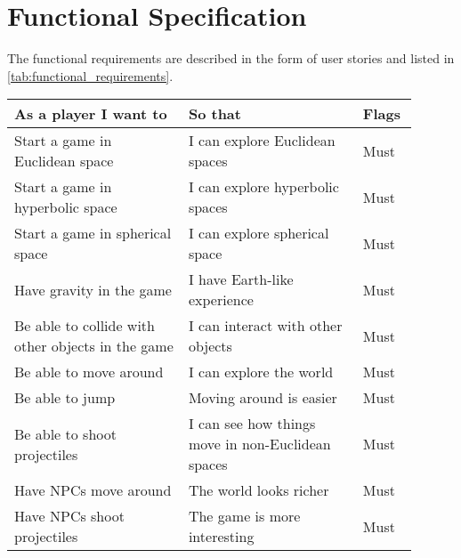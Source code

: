 \chapter{Functional Specification}\label{ch:functional_specification}
The functional requirements are described in the form of user stories and listed in \autoref{tab:functional_requirements}.

\begin{longtable}{|p{0.4\linewidth}|p{0.4\linewidth}|p{0.1\linewidth}|}
    \hline
    \textbf{As a player I want to}                             & \textbf{So that}                                                   & \textbf{Flags} \\
    \hline
    \endhead
    Start a game in Euclidean space                            & I can explore Euclidean spaces                                     & Must           \\
    Start a game in hyperbolic space                           & I can explore hyperbolic spaces                                    & Must           \\
    Start a game in spherical space                            & I can explore spherical space                                      & Must           \\
    Have gravity in the game                                   & I have Earth-like experience                                       & Must           \\
    Be able to collide with other objects in the game          & I can interact with other objects                                  & Must           \\
    Be able to move around                                     & I can explore the world                                            & Must           \\
    Be able to jump                                            & Moving around is easier                                            & Must           \\
    Be able to shoot projectiles                               & I can see how things move in non-Euclidean spaces                  & Must           \\
    Have NPCs move around                                      & The world looks richer                                             & Must           \\
    Have NPCs shoot projectiles                                & The game is more interesting                                       & Must           \\

\end{longtable}

